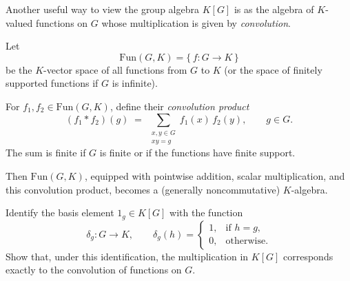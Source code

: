 \begin{remark}\label{rem:group-algebra-convolution}
Another useful way to view the group algebra $K[G]$ is as the algebra of $K$-valued functions on $G$
whose multiplication is given by \emph{convolution}.

Let
\[
\mathrm{Fun}(G,K)=\{\,f:G\to K\,\}
\]
be the $K$-vector space of all functions from $G$ to $K$ (or the space of finitely supported functions if $G$ is infinite).

For $f_1,f_2\in\mathrm{Fun}(G,K)$, define their \emph{convolution product}
\[
(f_1*f_2)(g)
   \;=\;
   \sum_{\substack{x,y\in G\\ xy=g}} f_1(x)\,f_2(y),
   \qquad g\in G.
\]
The sum is finite if $G$ is finite or if the functions have finite support.

Then $\mathrm{Fun}(G,K)$, equipped with pointwise addition, scalar multiplication, and this convolution product, becomes a (generally noncommutative) $K$-algebra.
\end{remark}

\begin{exercise}[1.1.15]\label{ex:1.1.15}
Identify the basis element $1_g\in K[G]$ with the function
\[
\delta_g:G\longrightarrow K, \qquad
\delta_g(h)=
\begin{cases}
1, & \text{if } h=g,\\[4pt]
0, & \text{otherwise.}
\end{cases}
\]
Show that, under this identification, the multiplication in $K[G]$ corresponds exactly
to the convolution of functions on $G$.
\end{exercise}

